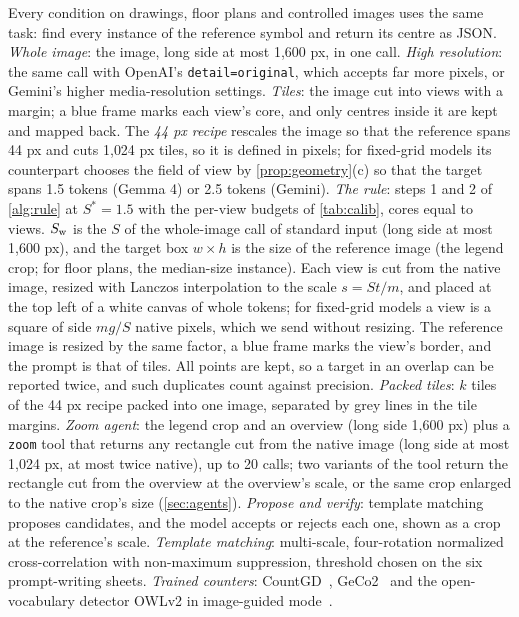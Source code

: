 Every condition on drawings, floor plans and controlled images uses the same task: find every instance of the reference symbol and return its centre as JSON.
\emph{Whole image}: the image, long side at most 1{,}600 px, in one call.
\emph{High resolution}: the same call with OpenAI's \texttt{detail=original}, which accepts far more pixels, or Gemini's higher media-resolution settings.
\emph{Tiles}: the image cut into views with a margin; a blue frame marks each view's core, and only centres inside it are kept and mapped back. The \emph{44 px recipe} rescales the image so that the reference spans 44 px and cuts 1{,}024 px tiles, so it is defined in pixels; for fixed-grid models its counterpart chooses the field of view by \cref{prop:geometry}(c) so that the target spans 1.5 tokens (Gemma 4) or 2.5 tokens (Gemini).
\emph{The rule}: steps 1 and 2 of \cref{alg:rule} at $S^\ast = 1.5$ with the per-view budgets of \cref{tab:calib}, cores equal to views. $S_{\mathrm{w}}$ is the $S$ of the whole-image call of standard input (long side at most 1{,}600 px), and the target box $w \times h$ is the size of the reference image (the legend crop; for floor plans, the median-size instance). Each view is cut from the native image, resized with Lanczos interpolation to the scale $s = St/m$, and placed at the top left of a white canvas of whole tokens; for fixed-grid models a view is a square of side $mg/S$ native pixels, which we send without resizing. The reference image is resized by the same factor, a blue frame marks the view's border, and the prompt is that of tiles. All points are kept, so a target in an overlap can be reported twice, and such duplicates count against precision.
\emph{Packed tiles}: $k$ tiles of the 44 px recipe packed into one image, separated by grey lines in the tile margins.
\emph{Zoom agent}: the legend crop and an overview (long side 1{,}600 px) plus a \texttt{zoom} tool that returns any rectangle cut from the native image (long side at most 1{,}024 px, at most twice native), up to 20 calls; two variants of the tool return the rectangle cut from the overview at the overview's scale, or the same crop enlarged to the native crop's size (\cref{sec:agents}).
\emph{Propose and verify}: template matching proposes candidates, and the model accepts or rejects each one, shown as a crop at the reference's scale.
\emph{Template matching}: multi-scale, four-rotation normalized cross-correlation with non-maximum suppression, threshold chosen on the six prompt-writing sheets.
\emph{Trained counters}: CountGD~\cite{amininaieni2024countgd}, GeCo2~\cite{pelhan2026geco2} and the open-vocabulary detector OWLv2 in image-guided mode~\cite{minderer2023owlv2}.

